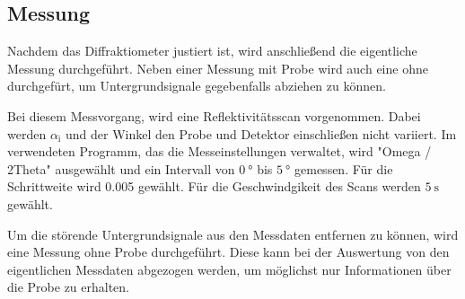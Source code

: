 \subsection{Messung}
\label{subsec:messung}
Nachdem das Diffraktiometer justiert ist, wird anschließend
die eigentliche Messung durchgeführt.
Neben einer Messung mit Probe wird auch eine ohne durchgefürt,
um Untergrundsignale gegebenfalls abziehen zu können.

Bei diesem Messvorgang, wird eine Reflektivitätsscan vorgenommen.
Dabei werden $\alpha_{\text{i}}$ und der Winkel den Probe und Detektor einschließen nicht
variiert. Im verwendeten Programm, das die Messeinstellungen verwaltet, wird
"Omega / 2Theta" ausgewählt und ein Intervall von $\SI{0}{\degree}$ bis
$\SI{5}{\degree}$ gemessen.
Für die Schrittweite wird 0.005 %
gewählt. Für die Geschwindgikeit des Scans werden $\SI{5}{\second}$ gewählt.


Um die störende Untergrundsignale aus den Messdaten entfernen zu können,
wird eine Messung ohne Probe durchgeführt. Diese kann bei der Auswertung
von den eigentlichen Messdaten abgezogen werden, um möglichst nur
Informationen über die Probe zu erhalten.
